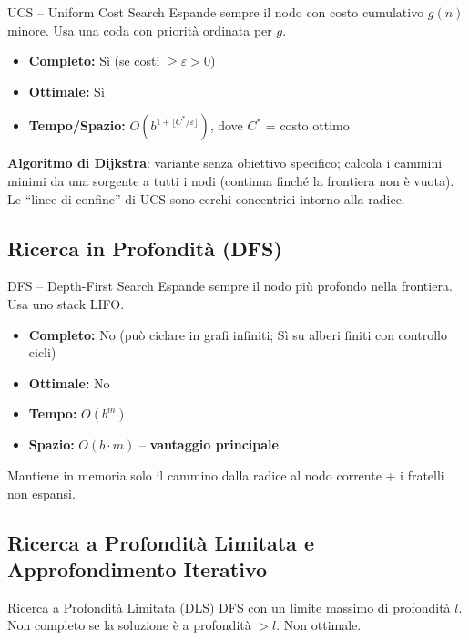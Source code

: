 \documentclass[12pt,a4paper]{article}
\begin{document}
\begin{thmbox}{UCS -- Uniform Cost Search}
Espande sempre il nodo con costo cumulativo $g(n)$ minore. Usa una coda con priorità ordinata per $g$.

\begin{itemize}[noitemsep]
  \item \textbf{Completo:} Sì (se costi $\geq \varepsilon > 0$)
  \item \textbf{Ottimale:} Sì
  \item \textbf{Tempo/Spazio:} $O(b^{1+\lfloor C^*/\varepsilon \rfloor})$, dove $C^*$ = costo ottimo
\end{itemize}
\textbf{Algoritmo di Dijkstra}: variante senza obiettivo specifico; calcola i cammini minimi da una sorgente a tutti i nodi (continua finché la frontiera non è vuota). Le ``linee di confine'' di UCS sono cerchi concentrici intorno alla radice.
\end{thmbox}

\subsection{Ricerca in Profondità (DFS)}

\begin{thmbox}{DFS -- Depth-First Search}
Espande sempre il nodo più profondo nella frontiera. Usa uno stack LIFO.

\begin{itemize}[noitemsep]
  \item \textbf{Completo:} No (può ciclare in grafi infiniti; Sì su alberi finiti con controllo cicli)
  \item \textbf{Ottimale:} No
  \item \textbf{Tempo:} $O(b^m)$
  \item \textbf{Spazio:} $O(b \cdot m)$ -- \textbf{vantaggio principale}
\end{itemize}
Mantiene in memoria solo il cammino dalla radice al nodo corrente + i fratelli non espansi.
\end{thmbox}

\subsection{Ricerca a Profondità Limitata e Approfondimento Iterativo}

\begin{defbox}{Ricerca a Profondità Limitata (DLS)}
DFS con un limite massimo di profondità $l$. Non completo se la soluzione è a profondità $> l$. Non ottimale.
\end{defbox}
\end{document}

